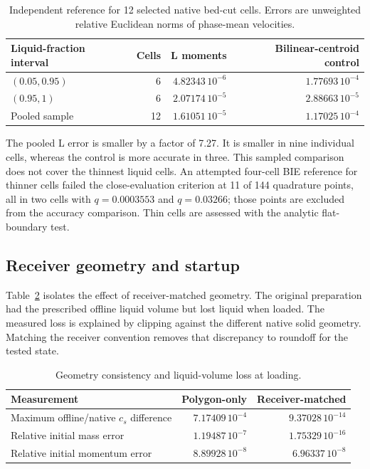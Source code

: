 \documentclass[10pt]{article}
\begin{document}
\begin{table}[htbp]\centering\small
\caption{Independent reference for 12 selected native bed-cut cells.
Errors are unweighted relative Euclidean norms of phase-mean velocities.}
\label{tab:native-reference}
\begin{tabular}{lrrr}\toprule
Liquid-fraction interval & Cells & L moments & Bilinear-centroid control\\\midrule
$(0.05,0.95)$ & 6 & $4.82343\,10^{-6}$ & $1.77693\,10^{-4}$\\
$(0.95,1)$ & 6 & $2.07174\,10^{-5}$ & $2.88663\,10^{-5}$\\
Pooled sample & 12 & $1.61051\,10^{-5}$ & $1.17025\,10^{-4}$\\
\bottomrule\end{tabular}
\end{table}

The pooled L error is smaller by a factor of 7.27. It is smaller in
nine individual cells, whereas the control is more accurate in three.
This sampled comparison does not cover the thinnest liquid cells. An
attempted four-cell BIE reference for thinner cells failed the close-evaluation
criterion at 11 of 144 quadrature points, all in two cells with
$q=0.0003553$ and $q=0.03266$; those points are excluded from the accuracy
comparison. Thin cells are assessed with the analytic flat-boundary test.

\subsection{Receiver geometry and startup}
Table~\ref{tab:geometry} isolates the effect of receiver-matched geometry.
The original preparation had the prescribed offline liquid volume but lost
liquid when loaded. The measured loss is explained by clipping against the
different native solid geometry. Matching the receiver convention removes
that discrepancy to roundoff for the tested state.

\begin{table}[htbp]\centering\small
\caption{Geometry consistency and liquid-volume loss at loading.}
\label{tab:geometry}
\begin{tabular}{lrr}\toprule
Measurement & Polygon-only & Receiver-matched\\\midrule
Maximum offline/native $c_s$ difference & $7.17409\,10^{-4}$ & $9.37028\,10^{-14}$\\
Relative initial mass error & $1.19487\,10^{-7}$ & $1.75329\,10^{-16}$\\
Relative initial momentum error & $8.89928\,10^{-8}$ & $6.96337\,10^{-8}$\\
\bottomrule\end{tabular}
\end{table}
\end{document}
